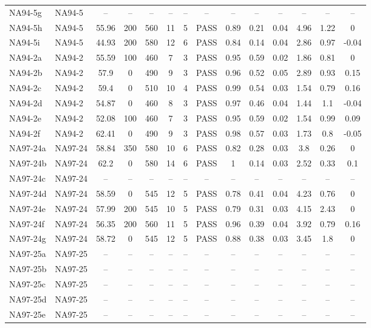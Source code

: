 \documentclass[draft]{agujournal2019}
\begin{document}
\begin{landscape}
\begin{longtable}{llcccccccccccc}
NA94-5g	&	NA94-5	&	–	&	–	&	–	&	–	&	–	&	–	&	–	&	–	&	–	&	–	&	–	&	–	\\
NA94-5h	&	NA94-5	&	55.96	&	200	&	560	&	11	&	5	&	PASS	&	0.89	&	0.21	&	0.04	&	4.96	&	1.22	&	0	\\
NA94-5i	&	NA94-5	&	44.93	&	200	&	580	&	12	&	6	&	PASS	&	0.84	&	0.14	&	0.04	&	2.86	&	0.97	&	-0.04	\\
NA94-2a	&	NA94-2	&	55.59	&	100	&	460	&	7	&	3	&	PASS	&	0.95	&	0.59	&	0.02	&	1.86	&	0.81	&	0	\\
NA94-2b	&	NA94-2	&	57.9	&	0	&	490	&	9	&	3	&	PASS	&	0.96	&	0.52	&	0.05	&	2.89	&	0.93	&	0.15	\\
NA94-2c	&	NA94-2	&	59.4	&	0	&	510	&	10	&	4	&	PASS	&	0.99	&	0.54	&	0.03	&	1.54	&	0.79	&	0.16	\\
NA94-2d	&	NA94-2	&	54.87	&	0	&	460	&	8	&	3	&	PASS	&	0.97	&	0.46	&	0.04	&	1.44	&	1.1	&	-0.04	\\
NA94-2e	&	NA94-2	&	52.08	&	100	&	460	&	7	&	3	&	PASS	&	0.95	&	0.59	&	0.02	&	1.54	&	0.99	&	0.09	\\
NA94-2f	&	NA94-2	&	62.41	&	0	&	490	&	9	&	3	&	PASS	&	0.98	&	0.57	&	0.03	&	1.73	&	0.8	&	-0.05	\\
NA97-24a	&	NA97-24	&	58.84	&	350	&	580	&	10	&	6	&	PASS	&	0.82	&	0.28	&	0.03	&	3.8	&	0.26	&	0	\\
NA97-24b	&	NA97-24	&	62.2	&	0	&	580	&	14	&	6	&	PASS	&	1	&	0.14	&	0.03	&	2.52	&	0.33	&	0.1	\\
NA97-24c	&	NA97-24	&	–	&	–	&	–	&	–	&	–	&	–	&	–	&	–	&	–	&	–	&	–	&	–	\\
NA97-24d	&	NA97-24	&	58.59	&	0	&	545	&	12	&	5	&	PASS	&	0.78	&	0.41	&	0.04	&	4.23	&	0.76	&	0	\\
NA97-24e	&	NA97-24	&	57.99	&	200	&	545	&	10	&	5	&	PASS	&	0.79	&	0.31	&	0.03	&	4.15	&	2.43	&	0	\\
NA97-24f	&	NA97-24	&	56.35	&	200	&	560	&	11	&	5	&	PASS	&	0.96	&	0.39	&	0.04	&	3.92	&	0.79	&	0.16	\\
NA97-24g	&	NA97-24	&	58.72	&	0	&	545	&	12	&	5	&	PASS	&	0.88	&	0.38	&	0.03	&	3.45	&	1.8	&	0	\\
NA97-25a	&	NA97-25	&	–	&	–	&	–	&	–	&	–	&	–	&	–	&	–	&	–	&	–	&	–	&	–	\\
NA97-25b	&	NA97-25	&	–	&	–	&	–	&	–	&	–	&	–	&	–	&	–	&	–	&	–	&	–	&	–	\\
NA97-25c	&	NA97-25	&	–	&	–	&	–	&	–	&	–	&	–	&	–	&	–	&	–	&	–	&	–	&	–	\\
NA97-25d	&	NA97-25	&	–	&	–	&	–	&	–	&	–	&	–	&	–	&	–	&	–	&	–	&	–	&	–	\\
NA97-25e	&	NA97-25	&	–	&	–	&	–	&	–	&	–	&	–	&	–	&	–	&	–	&	–	&	–	&	–	\\

\end{longtable}
\end{landscape}
\end{document}
